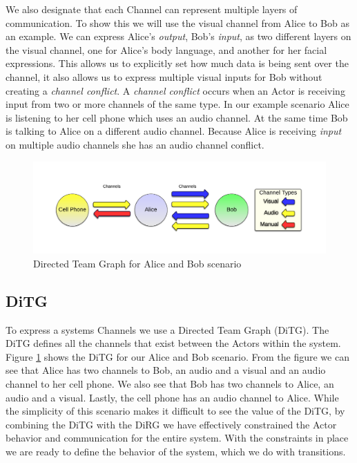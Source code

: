 We also designate that each Channel can represent multiple layers of communication.  To show this we will use the visual channel from Alice to Bob as an example.  We can express Alice's {\em output}, Bob's {\em input}, as two different layers on the visual channel, one for Alice's body language, and another for her facial expressions.  This allows us to explicitly set how much data is being sent over the channel, it also allows us to express multiple visual inputs for Bob without creating a {\em channel conflict}.  A {\em channel conflict} occurs when an Actor is receiving input from two or more channels of the same type.  In our example scenario Alice is listening to her cell phone which uses an audio channel.  At the same time Bob is talking to Alice on a different audio channel.  Because Alice is receiving {\em input} on multiple audio channels she has an audio channel conflict.  

\begin{figure}[h]
\begin{center}
\includegraphics[width=\textwidth]{ab_ditg.png}
\caption{Directed Team Graph for Alice and Bob scenario}
\label{fig:ab_ditg}
\end{center}
\end{figure}

\subsection{DiTG}
To express a systems Channels we use a Directed Team Graph (DiTG)\cite{moore2014modeling}.  The DiTG defines all the channels that exist between the Actors within the system.  Figure \ref{fig:ab_ditg} shows the DiTG for our Alice and Bob scenario.  From the figure we can see that Alice has two channels to Bob, an audio and a visual and an audio channel to her cell phone.  We also see that Bob has two channels to Alice, an audio and a visual.  Lastly, the cell phone has an audio channel to Alice.  While the simplicity of this scenario makes it difficult to see the value of the DiTG, by combining the DiTG with the DiRG we have effectively constrained the Actor behavior and communication for the entire system.  With the constraints in place we are ready to define the behavior of the system, which we do with transitions.


